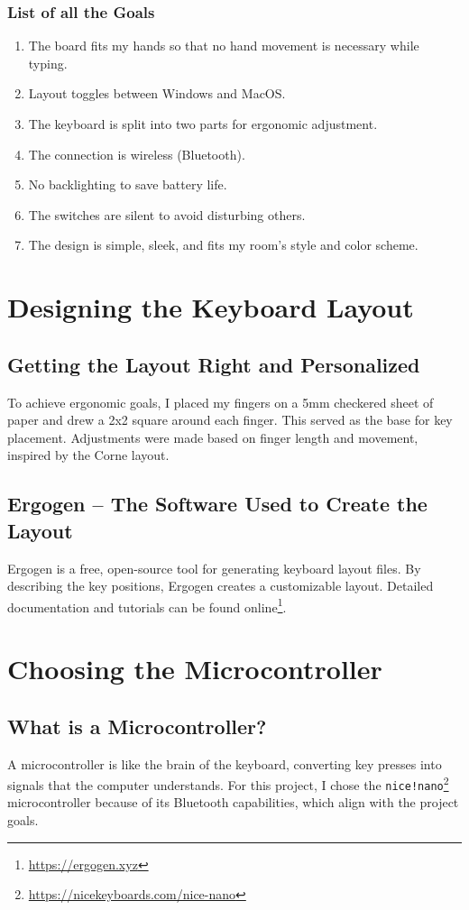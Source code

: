 \documentclass[a4paper,12pt]{article}
\begin{document}
\subsubsection{List of all the Goals}
\begin{enumerate}
    \item The board fits my hands so that no hand movement is necessary while typing.
    \item Layout toggles between Windows and MacOS.
    \item The keyboard is split into two parts for ergonomic adjustment.
    \item The connection is wireless (Bluetooth).
    \item No backlighting to save battery life.
    \item The switches are silent to avoid disturbing others.
    \item The design is simple, sleek, and fits my room's style and color scheme.
\end{enumerate}

\section{Designing the Keyboard Layout}

\subsection{Getting the Layout Right and Personalized}
To achieve ergonomic goals, I placed my fingers on a 5mm checkered sheet of paper and drew a 2x2 square around each finger. This served as the base for key placement. Adjustments were made based on finger length and movement, inspired by the Corne layout.

\subsection{Ergogen – The Software Used to Create the Layout}
Ergogen is a free, open-source tool for generating keyboard layout files. By describing the key positions, Ergogen creates a customizable layout. Detailed documentation and tutorials can be found online\footnote{\url{https://ergogen.xyz}}.

\section{Choosing the Microcontroller}
\subsection{What is a Microcontroller?}
A microcontroller is like the brain of the keyboard, converting key presses into signals that the computer understands. For this project, I chose the \texttt{nice!nano}\footnote{\url{https://nicekeyboards.com/nice-nano}} microcontroller because of its Bluetooth capabilities, which align with the project goals.
\end{document}
